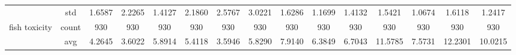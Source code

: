 \begin{table}[H]
{\begin{tabular}{rcccc|c|c|c|c|c|ccccc}
			                                                                               & std                                    & 1.6587                                                                             & 2.2265                                                                    & 1.4127                                                                    & 2.1860                                         & 2.5767                                                                    & 3.0221                                       & 1.6286                                      & 1.1699                                         & 1.4132                                         & 1.5421                                          & 1.0674                                          & 1.6118                                         & 1.2417                                         \\
			fish toxicity                                                                  & count                                  & 930                                                                                & 930                                                                       & 930                                                                       & 930                                            & 930                                                                       & 930                                          & 930                                         & 930                                            & 930                                            & 930                                             & 930                                             & 930                                            & 930                                            \\
			                                                                               & avg                                    & 4.2645                                                                             & 3.6022                                                                    & 5.8914                                                                    & 5.4118                                         & \cellcolor[rgb]{ .776,  .937,  .808}\textcolor[rgb]{ 0,  .38,  0}{3.5946} & 5.8290                                       & 7.9140                                      & 6.3849                                         & 6.7043                                         & 11.5785                                         & 7.5731                                          & 12.2301                                        & 10.0215                                        \\

\end{tabular}}
\end{table}
